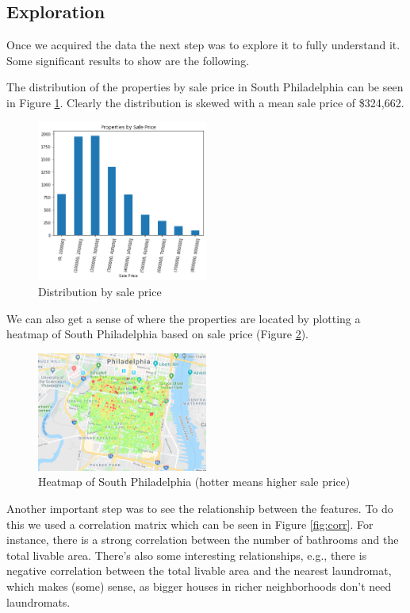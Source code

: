 \documentclass[11pt,a4paper]{article}
\begin{document}
\subsection{Exploration}

Once we acquired the data the next step was to explore it
to fully understand it. Some significant results to show are
the following.

\medskip

The distribution of the properties by sale price in South Philadelphia can be seen in Figure \ref{fig:distribution}.
Clearly the distribution is skewed with a mean sale
price of \$324,662.

\begin{figure}[h]
\centering
\includegraphics[width=0.5\textwidth]{properties_sale_price}
\caption{Distribution by sale price}
\label{fig:distribution}
\end{figure}

We can also get a sense of where the properties are located
by plotting a heatmap of South Philadelphia based on
sale price (Figure \ref{fig:heatmap}).

\begin{figure}[h]
\centering
\includegraphics[width=0.5\textwidth]{heatmap}
\caption{Heatmap of South Philadelphia (hotter means higher
sale price)}
\label{fig:heatmap}
\end{figure}

Another important step was to see the relationship
between the features. To do this we used a correlation
matrix which can be seen in Figure \ref{fig:corr}. For instance, there is a strong correlation between the number of bathrooms and the total livable area. There's also some interesting relationships, e.g., there is negative correlation between the total livable area and the nearest laundromat, which makes (some) sense, as bigger houses in richer neighborhoods don't need laundromats.
\end{document}
